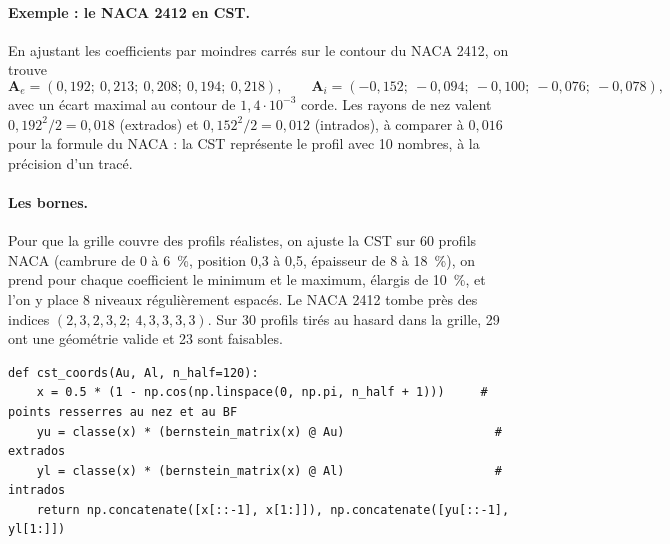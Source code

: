 \paragraph{Exemple : le NACA 2412 en CST.} En ajustant les coefficients par moindres carrés sur le contour du NACA 2412, on trouve
\[ \mathbf A_e=(0{,}192;\ 0{,}213;\ 0{,}208;\ 0{,}194;\ 0{,}218),\qquad\mathbf A_i=(-0{,}152;\ -0{,}094;\ -0{,}100;\ -0{,}076;\ -0{,}078), \]
avec un écart maximal au contour de $1{,}4\cdot10^{-3}$ corde. Les rayons de nez valent $0{,}192^2/2=0{,}018$ (extrados) et $0{,}152^2/2=0{,}012$ (intrados), à comparer à $0{,}016$ pour la formule du NACA : la CST représente le profil avec 10 nombres, à la précision d'un tracé.

\paragraph{Les bornes.} Pour que la grille couvre des profils réalistes, on ajuste la CST sur 60 profils NACA (cambrure de 0 à 6~\%, position 0,3 à 0,5, épaisseur de 8 à 18~\%), on prend pour chaque coefficient le minimum et le maximum, élargis de 10~\%, et l'on y place 8 niveaux régulièrement espacés. Le NACA 2412 tombe près des indices $(2,3,2,3,2;\ 4,3,3,3,3)$. Sur 30 profils tirés au hasard dans la grille, 29 ont une géométrie valide et 23 sont faisables.

\begin{codebox}
\begin{lstlisting}
def cst_coords(Au, Al, n_half=120):
    x = 0.5 * (1 - np.cos(np.linspace(0, np.pi, n_half + 1)))     # points resserres au nez et au BF
    yu = classe(x) * (bernstein_matrix(x) @ Au)                     # extrados
    yl = classe(x) * (bernstein_matrix(x) @ Al)                     # intrados
    return np.concatenate([x[::-1], x[1:]]), np.concatenate([yu[::-1], yl[1:]])
\end{lstlisting}
\end{codebox}

